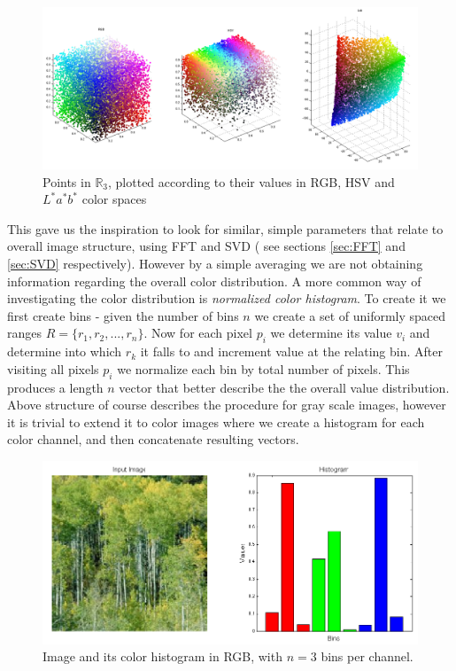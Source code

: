 \documentclass{report}
\begin{document}
\begin{figure}[hbtp]
\centering
\includegraphics[scale=0.3]{graphics/colorSpaces.png}
\caption{Points in $\mathbb{R}_3$, plotted according to their values in RGB, HSV and $L^*a^*b^*$ color spaces }
\label{fig:colSpaces}
\end{figure}

This gave us the inspiration to look for similar, simple parameters that relate to overall image structure, using FFT and SVD ( see sections \ref{sec:FFT} and \ref{sec:SVD} respectively). However by a simple averaging we are not obtaining information regarding the overall color distribution. A more common way of investigating the color distribution is \textit{normalized color histogram}. To create it we first create bins - given the number of bins $n$ we create a set of uniformly spaced ranges $R = \{r_1, r_2, ..., r_n\}$. Now for each pixel $p_i$ we determine its value $v_i$ and determine into which $r_k$ it falls to and increment value at the relating bin. After visiting all pixels $p_i$ we normalize each bin by total number of pixels. This produces a length $n$ vector that better describe the the overall value distribution. Above structure of course describes the procedure for gray scale images, however it is trivial to extend it to color images where we create a histogram for each color channel, and then concatenate resulting vectors.

\begin{figure}[hbtp]
\centering
\includegraphics[scale=0.3]{graphics/colorHistogram.png}
\caption{Image and its color histogram in RGB, with $n = 3$ bins per channel. }
\label{fig:colSpaces}
\end{figure}
\end{document}
